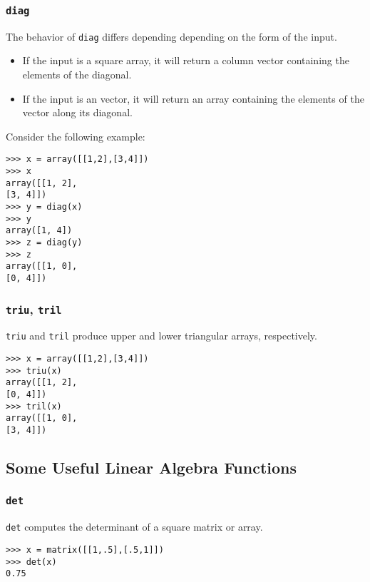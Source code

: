 \documentclass[Pydata.tex]{subfiles}
\begin{document}
\subsubsection*{\texttt{diag}}
The behavior of \texttt{diag} differs depending depending on the form of the input. 
\begin{itemize}
\item If the input is a square array, it
will return a column vector containing the elements of the diagonal. 
\item If the input is an vector, it will return
an array containing the elements of the vector along its diagonal. 
\end{itemize}

Consider the following example:
\begin{framed}
\begin{verbatim}
>>> x = array([[1,2],[3,4]])
>>> x
array([[1, 2],
[3, 4]])
>>> y = diag(x)
>>> y
array([1, 4])
>>> z = diag(y)
>>> z
array([[1, 0],
[0, 4]])
\end{verbatim}
\end{framed}
\subsubsection*{\texttt{triu}, \texttt{tril}}
\texttt{triu} and \texttt{tril} produce upper and lower triangular arrays, respectively.
\begin{framed}
\begin{verbatim}
>>> x = array([[1,2],[3,4]])
>>> triu(x)
array([[1, 2],
[0, 4]])
>>> tril(x)
array([[1, 0],
[3, 4]])

\end{verbatim}
\end{framed}

\newpage
\subsection{Some Useful Linear Algebra Functions}
\subsubsection*{\texttt{det}}
\texttt{det} computes the determinant of a square matrix or array.
\begin{framed}
\begin{verbatim}
>>> x = matrix([[1,.5],[.5,1]])
>>> det(x)
0.75
\end{verbatim}
\end{framed}
\end{document}

